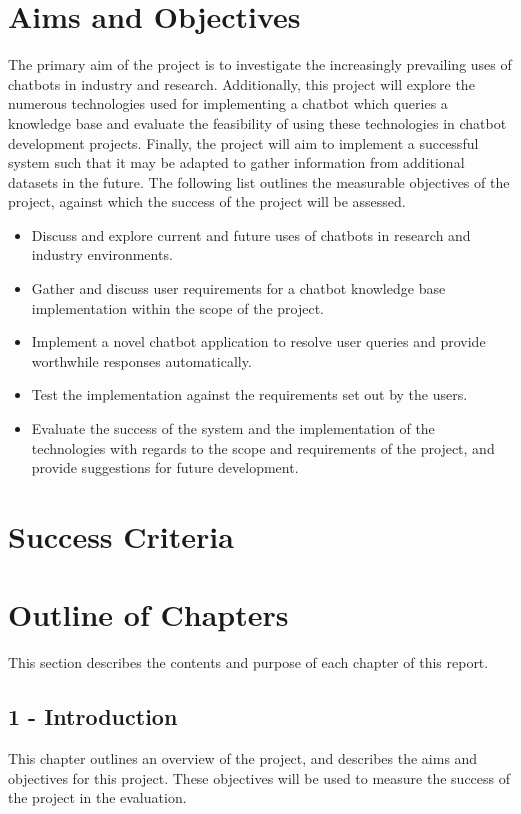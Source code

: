\section{Aims and Objectives}
\label{sec:aims}
The primary aim of the project is to investigate the increasingly prevailing uses of chatbots in industry and research. Additionally, this project will explore the numerous technologies used for implementing a chatbot which queries a knowledge base and evaluate the feasibility of using these technologies in chatbot development projects. Finally, the project will aim to implement a successful system such that it may be adapted to gather information from additional datasets in the future. The following list outlines the measurable objectives of the project, against which the success of the project will be assessed.

\begin{itemize}
	\itemsep0em 
	\item Discuss and explore current and future uses of chatbots in research and industry environments.
	\item Gather and discuss user requirements for a chatbot knowledge base implementation within the scope of the project.
	\item Implement a novel chatbot application to resolve user queries and provide worthwhile responses automatically.
	\item Test the implementation against the requirements set out by the users.
	\item Evaluate the success of the system and the implementation of the technologies with regards to the scope and requirements of the project, and provide suggestions for future development.

\end{itemize}

\section{Success Criteria}

\newpage
\section{Outline of Chapters}
This section describes the contents and purpose of each chapter of this report.

\subsection*{1 - Introduction}
This chapter outlines an overview of the project, and describes the aims and objectives for this project. These objectives will be used to measure the success of the project in the evaluation.

